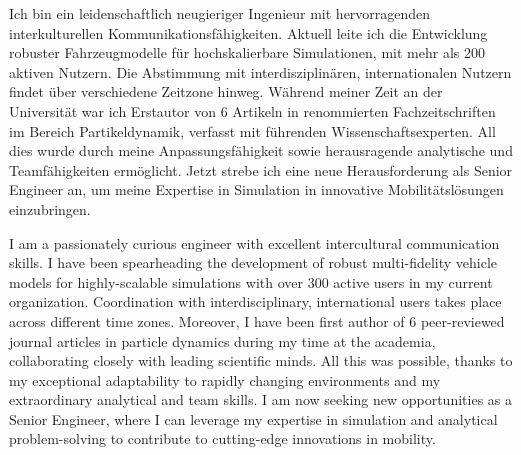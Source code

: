 \documentclass{mycv}
\begin{document}
{\rlap{\color{templateColor4}\rule[0mm]{\textwidth}{\ulinewidth}}}
\setlength{\columnsep}{2.5em}
\setlength{\columnseprule}{\ulinewidth}
\begin{paracol}{2}
    {

        Ich bin ein leidenschaftlich neugieriger Ingenieur mit hervorragenden
        interkulturellen Kommunikationsf{\"a}higkeiten. Aktuell leite ich die
        Entwicklung robuster Fahrzeugmodelle für hochskalierbare Simulationen,
        mit mehr als 200 aktiven Nutzern. Die Abstimmung mit
        interdisziplin{\"a}ren, internationalen Nutzern findet {\"u}ber
        verschiedene Zeitzone hinweg. Während meiner Zeit an der Universität
        war ich Erstautor von 6 Artikeln in renommierten Fachzeitschriften im
        Bereich Partikeldynamik, verfasst mit führenden Wissenschaftsexperten.
        All dies wurde durch meine Anpassungsfähigkeit sowie herausragende
        analytische und Teamfähigkeiten ermöglicht. Jetzt strebe ich eine neue
        Herausforderung als Senior Engineer an, um meine Expertise in
        Simulation in innovative Mobilit{\"a}tsl{\"o}sungen einzubringen.\\

    } 
    { 


        I am a passionately curious engineer with excellent intercultural
        communication skills. I have been spearheading the development of
        robust multi-fidelity vehicle models for highly-scalable simulations
        with over 300 active users in my current organization. Coordination
        with interdisciplinary, international users takes place across
        different time zones. Moreover, I have been first author of 6
        peer-reviewed journal articles in particle dynamics during my time at
        the academia, collaborating closely with leading scientific minds. All
        this was possible, thanks to my exceptional adaptability to rapidly
        changing environments and my extraordinary analytical and team skills.
        I am now seeking new opportunities as a Senior Engineer, where I can
        leverage my expertise in simulation and analytical problem-solving to
        contribute to cutting-edge innovations in mobility.\\

    }


\end{paracol}
\end{document}

